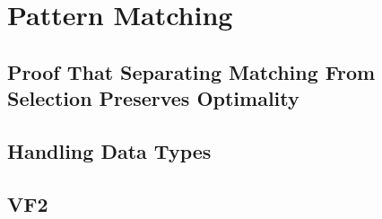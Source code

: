 %

\chapter{Pattern Matching}

\section{Proof That Separating Matching From Selection Preserves Optimality}
\section{Handling Data Types}
\section{VF2}
